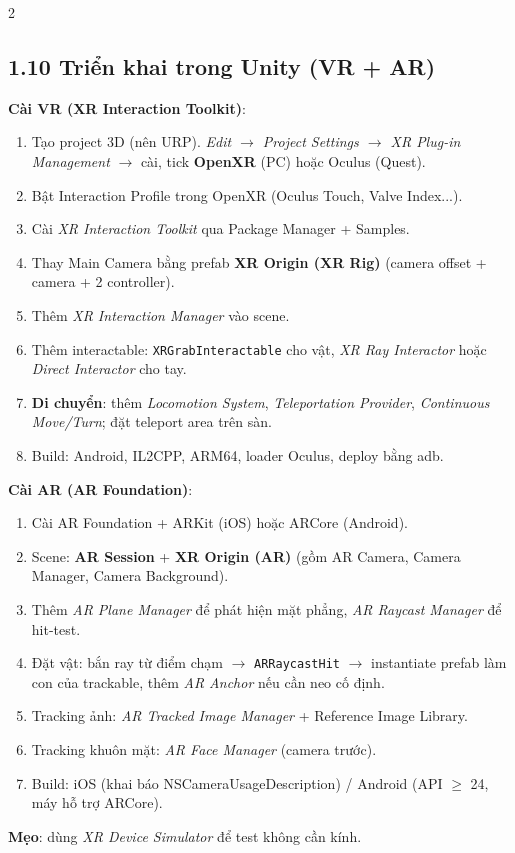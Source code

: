 \begin{paracol}{2}
\switchcolumn

\subsection*{1.10 Triển khai trong Unity (VR + AR)}
\textbf{Cài VR (XR Interaction Toolkit)}:
\begin{enumerate}[leftmargin=*,nosep]
  \item Tạo project 3D (nên URP). \emph{Edit $\to$ Project Settings $\to$ XR Plug-in Management} $\to$ cài, tick \textbf{OpenXR} (PC) hoặc Oculus (Quest).
  \item Bật Interaction Profile trong OpenXR (Oculus Touch, Valve Index...).
  \item Cài \emph{XR Interaction Toolkit} qua Package Manager + Samples.
  \item Thay Main Camera bằng prefab \textbf{XR Origin (XR Rig)} (camera offset + camera + 2 controller).
  \item Thêm \emph{XR Interaction Manager} vào scene.
  \item Thêm interactable: \texttt{XRGrabInteractable} cho vật, \emph{XR Ray Interactor} hoặc \emph{Direct Interactor} cho tay.
  \item \textbf{Di chuyển}: thêm \emph{Locomotion System}, \emph{Teleportation Provider}, \emph{Continuous Move/Turn}; đặt teleport area trên sàn.
  \item Build: Android, IL2CPP, ARM64, loader Oculus, deploy bằng adb.
\end{enumerate}
\textbf{Cài AR (AR Foundation)}:
\begin{enumerate}[leftmargin=*,nosep]
  \item Cài AR Foundation + ARKit (iOS) hoặc ARCore (Android).
  \item Scene: \textbf{AR Session} + \textbf{XR Origin (AR)} (gồm AR Camera, Camera Manager, Camera Background).
  \item Thêm \emph{AR Plane Manager} để phát hiện mặt phẳng, \emph{AR Raycast Manager} để hit-test.
  \item Đặt vật: bắn ray từ điểm chạm $\to$ \texttt{ARRaycastHit} $\to$ instantiate prefab làm con của trackable, thêm \emph{AR Anchor} nếu cần neo cố định.
  \item Tracking ảnh: \emph{AR Tracked Image Manager} + Reference Image Library.
  \item Tracking khuôn mặt: \emph{AR Face Manager} (camera trước).
  \item Build: iOS (khai báo NSCameraUsageDescription) / Android (API $\geq$ 24, máy hỗ trợ ARCore).
\end{enumerate}
\textbf{Mẹo}: dùng \emph{XR Device Simulator} để test không cần kính.


\end{paracol}
